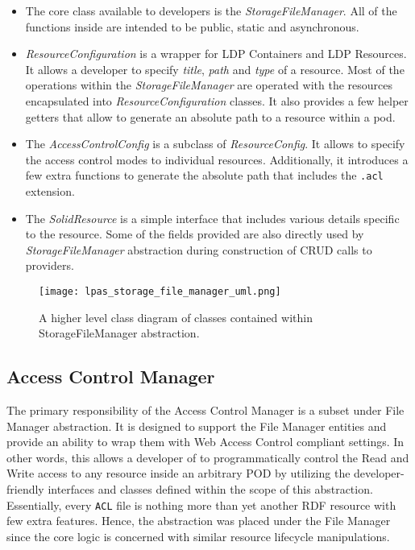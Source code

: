 \begin{itemize}
	\item The core class available to \lpa{} developers is the \textit{StorageFileManager}. All of the functions inside are intended to be public, static and asynchronous. 
	\item \textit{ResourceConfiguration} is a wrapper for LDP Containers and LDP Resources. It allows a developer to specify \textit{title}, \textit{path} and \textit{type} of a resource. Most of the operations within the \textit{StorageFileManager} are operated with the resources encapsulated into \textit{ResourceConfiguration} classes. It also provides a few helper getters that allow to generate an absolute path to a resource within a pod. 
	\item The \textit{AccessControlConfig} is a subclass of \textit{ResourceConfig}. It allows to specify the access control modes to individual resources. Additionally, it introduces a few extra functions to generate the absolute path that includes the \texttt{.acl} extension.   
	\item The \textit{SolidResource} is a simple interface that includes various details specific to the resource. Some of the fields provided are also directly used by \textit{StorageFileManager} abstraction during construction of CRUD calls to \solid{} providers.
\end{itemize}


\begin{figure}[h]
\centering
\texttt{[image: lpas\_storage\_file\_manager\_uml.png]}
\caption{A higher level class diagram of classes contained within StorageFileManager abstraction.}
\label{fig:lps_file_manager_class_uml}
\end{figure}


\subsection{Access Control Manager}
\label{sssec:access_control_manager_arch}

The primary responsibility of the Access Control Manager is a subset under File Manager abstraction. It is designed to support the File Manager entities and provide an ability to wrap them with Web Access Control compliant settings. In other words, this allows a developer of \lpa{} to programmatically control the Read and Write access to any resource inside an arbitrary \solid{} POD by utilizing the developer-friendly interfaces and classes defined within the scope of this abstraction. Essentially, every \texttt{ACL} file is nothing more than yet another RDF resource with few extra features. Hence, the abstraction was placed under the File Manager since the core logic is concerned with similar resource lifecycle manipulations.

